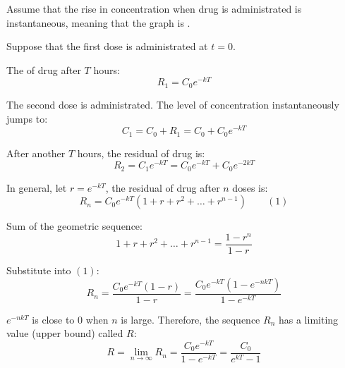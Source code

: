     \par Assume that the rise in concentration when drug is administrated is instantaneous, meaning that the graph is .
    \par Suppose that the first dose is administrated at $t = 0$.
    \par The  of drug after $T$ hours:
      \[
        R_1 = C_0 e^{-kT}
        \]
    \par The second dose is administrated. The level of concentration instantaneously jumps to:
      \[
        C_1 = C_0 + R_1 = C_0 + C_0 e^{-kT}
        \]
    \par After another $T$ hours, the residual of drug is:
      \[
        R_2 = C_1 e^{-kT} = C_0 e^{-kT} + C_0 e^{-2kT}
        \]
    \par In general, let $r = e^{-kT}$, the residual of drug after $n$ doses is:
      \[
        R_n = C_0 e^{-kT} (1 + r + r^2 + \ldots + r^{n - 1}) \qquad (1)
        \]
    \par Sum of the geometric sequence:
      \[
        1 + r + r^2 + \ldots + r^{n - 1} = \frac{1 - r^n}{1 - r}
        \]
    \par Substitute into $(1)$:
      \[
        R_n = \frac{C_0 e^{-kT} (1 - r)}{1 - r} = \frac{C_0 e^{-kT} (1 - e^{-nkT})}{1 - e^{-kT}}
        \]
    \par $e^{-nkT}$ is close to 0 when $n$ is large. Therefore, the sequence $R_n$ has a limiting value (upper bound) called $R$:
      \[
        R = \lim\limits_{n \to \infty} R_n
        = \frac{C_0 e^{-kT}}{1 - e^{-kT}}
        = \frac{C_0}{e^{kT} - 1}
        \]
  
